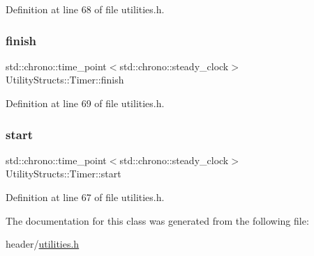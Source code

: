 Definition at line 68 of file utilities.\+h.

\mbox{\label{class_utility_structs_1_1_timer_a9b87226726489b3885d6faf4373c34b5}} 
\subsubsection{\texorpdfstring{finish}{finish}}
{\footnotesize\ttfamily std\+::chrono\+::time\+\_\+point$<$std\+::chrono\+::steady\+\_\+clock$>$ Utility\+Structs\+::\+Timer\+::finish}



Definition at line 69 of file utilities.\+h.

\mbox{\label{class_utility_structs_1_1_timer_a60bc754cb86990dad0003e8d49048c07}} 
\subsubsection{\texorpdfstring{start}{start}}
{\footnotesize\ttfamily std\+::chrono\+::time\+\_\+point$<$std\+::chrono\+::steady\+\_\+clock$>$ Utility\+Structs\+::\+Timer\+::start}



Definition at line 67 of file utilities.\+h.



The documentation for this class was generated from the following file\+:\begin{DoxyCompactItemize}
\item 
header/\hyperlink{utilities_8h}{utilities.\+h}\end{DoxyCompactItemize}
